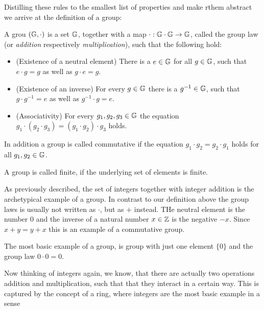 Distilling these rules to the smallest list of properties and make rthem abstract we arrive at the definition of a group:
\begin{definition}[Group]
A grou $ (\mathbb{G}, \cdot) $ is a set $ \mathbb{G}$, together with a map $ \cdot: \mathbb{G} \cdot \mathbb{G} \to \mathbb{G} $, called the group law (or \textit{addition} respectively \textit{multiplication}), such that the following hold:
\begin{itemize}
\item (Existence of a neutral element) There is a $e\in\mathbb{G}$ for all $g\in\mathbb{G}$, such that $e\cdot g=g$ as well as $g\cdot e = g$.
\item (Existence of an inverse) For every $g\in\mathbb{G}$ there is a $g^{-1}\in\mathbb{G}$, such that $g\cdot g^{-1}=e$ as well as $g^{-1}\cdot g = e$.
\item (Associativity) For every $g_1,g_2,g_3\in\mathbb{G}$ the equation 
$g_1\cdot(g_2\cdot g_3) = (g_1\cdot g_2)\cdot g_3$ holds.
\end{itemize}
In addition a group is called commutative if the equation 
$g_1\cdot g_2 = g_2 \cdot g_1$ holds for all $g_1,g_2\in\mathbb{G}$.

A group is called finite, if the underlying set of elements is finite.
\end{definition}
\begin{example}
As previously described, the set of integers together with integer addition is the archetypical example of a group. In contrast to our definition above the group laws is usually not written as $\cdot$, but as $+$ instead. THe neutral element is the number $0$ and the inverse of a natural number $x\in\mathbb{Z}$ is the negative $-x$. Since $x+y=y+x$ this is an example of a commutative group.
\end{example}
\begin{example}
The most basic example of a group, is group with just one element $\{0\}$ and the group law $0\cdot 0=0$.
\end{example}
Now thinking of integers again, we know, that there are actually two operations addition and multiplication, such that that they interact in a certain way. This is captured by the concept of a ring, where integers are the most basic example in a sense
